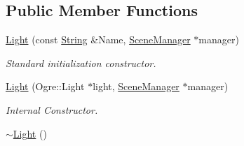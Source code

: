 \subsection*{Public Member Functions}
\begin{DoxyCompactItemize}
\item 
\hyperlink{classphys_1_1Light_a4bcb13aaf1ab92e7df71b565eeec61e4}{Light} (const \hyperlink{namespacephys_aa03900411993de7fbfec4789bc1d392e}{String} \&Name, \hyperlink{classphys_1_1SceneManager}{SceneManager} $\ast$manager)
\begin{DoxyCompactList}\small\item\em Standard initialization constructor. \item\end{DoxyCompactList}\item 
\hyperlink{classphys_1_1Light_a27cfdf1933c6b0054aa4ef8348f56daa}{Light} (Ogre::Light $\ast$light, \hyperlink{classphys_1_1SceneManager}{SceneManager} $\ast$manager)
\begin{DoxyCompactList}\small\item\em Internal Constructor. \item\end{DoxyCompactList}\item 
\hypertarget{classphys_1_1Light_a0ee3882bb8e1e613bd88380a9681af2e}{
\hyperlink{classphys_1_1Light_a0ee3882bb8e1e613bd88380a9681af2e}{$\sim$Light} ()}
\label{dc/df1/classphys_1_1Light_a0ee3882bb8e1e613bd88380a9681af2e}


\end{DoxyCompactItemize}
